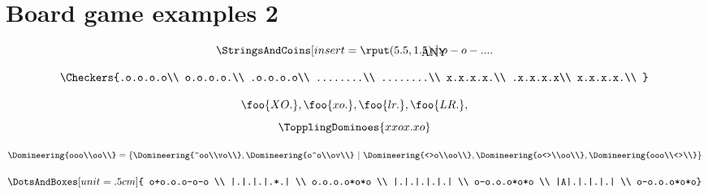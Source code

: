 \documentclass[12pt]{amsart}
\begin{document}
\section{Board game examples 2}

\[\StringsAndCoins[insert={\rput(5.5,1.5){\dashbox{.5}(3,3){ANY}}}]{.\\o-o-...\\.\\}\]

\[
\Checkers{.o.o.o.o\\
          o.o.o.o.\\
          .o.o.o.o\\
          ........\\
          ........\\
          x.x.x.x.\\
          .x.x.x.x\\
          x.x.x.x.\\
}
\]

\[\foo{XO.},
  \foo{xo.},
  \foo{lr.},
  \foo{LR.},
\]
\[\TopplingDominoes{xxox.xo}\]

\[
\Domineering{ooo\\oo\\} = \left\{
\Domineering{^oo\\vo\\},
\Domineering{o^o\\ov\\}
\ |\ %
\Domineering{<>o\\oo\\},
\Domineering{o<>\\oo\\},
\Domineering{ooo\\<>\\}
\right\}
\]



\begin{center}
\hspace{.25in}
\hspace{.25in}
\end{center}

\[
\DotsAndBoxes[unit=.5cm]{
  o+o.o.o-o-o \\
  |.|.|.|.*.| \\
  o.o.o.o*o*o \\
  |.|.|.|.|.| \\
  o-o.o.o*o*o \\
  |A|.|.|.|.| \\
  o-o.o.o*o*o}
\]
\end{document}
